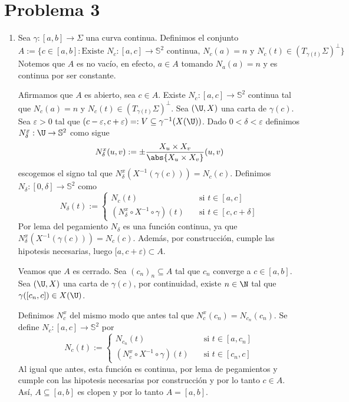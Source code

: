\documentclass{article}
\begin{document}
\section*{Problema 3}
\begin{enumerate}
    \item Sea $\gamma:[a,b]\to\Sigma$ una curva continua. Definimos el conjunto
    \begin{equation*}
        A:=\{c\in[a,b]:\text{Existe }N_{c}:[a,c]\to\mathbb{S}^{2}\text{ continua, }
        N_{c}(a)=n\text{ y }N_{c}(t)\in(T_{\gamma(t)}\Sigma)^{\perp}\}
    \end{equation*}
    Notemos que $A$ es no vacío, en efecto, $a\in A$ tomando $N_{a}(a)=n$ y es continua por ser
    constante. 
    
    \noindent Afirmamos que $A$ es abierto, sea $c\in A$. Existe $N_{c}:[a,c]\to\mathbb{S}^{2}$
    continua tal que $N_{c}(a)=n$ y $N_{c}(t)\in(T_{\gamma(t)}\Sigma)^{\perp}$. Sea $(\U,X)$ una 
    carta de $\gamma(c)$. Sea $\varepsilon>0$ tal que $(c-\varepsilon,c+\varepsilon)
    =:V\subseteq\gamma^{-1}(X(\U))$. Dado $0<\delta<\varepsilon$ definimos $N_{\delta}^{x}:
    \U\to\mathbb{S}^{2}$ como sigue
    \begin{equation*}
        N_{\delta}^{x}(u,v):=\pm\frac{X_{u}\times X_{v}}{\abs{X_{u}\times X_{v}}}(u,v)
    \end{equation*}
    escogemos el signo tal que $N_{\delta}^{x}(X^{-1}(\gamma(c)))=N_{c}(c)$. Definimos 
    $N_{\delta}:[0,\delta]\to\mathbb{S}^{2}$ como
    \begin{equation*}
        N_{\delta}(t):=\begin{cases}
            N_{c}(t) &\quad\text{si }t\in[a,c] \\
            (N_{\delta}^{x}\circ X^{-1}\circ\gamma)(t) &\quad\text{si }t\in[c,c+\delta]
        \end{cases}
    \end{equation*}
    Por lema del pegamiento $N_{\delta}$ es una función continua, ya que 
    $N_{\delta}^{x}(X^{-1}(\gamma(c)))=N_{c}(c)$. Además, por construcción, cumple las hipotesis 
    necesarias, luego $[a,c+\varepsilon)\subset A$.

    \noindent Veamos que $A$ es cerrado. Sea $(c_{n})_{n}\subseteq A$ tal que 
    $c_{n}$ converge a $c\in[a,b]$. Sea $(\U,X)$ una carta de $\gamma(c)$, por 
    continuidad, existe $n\in\N$ tal que $\gamma([c_{n},c])\in X(\U)$. 
    
    Definimos $N_{c}^{x}$ del mismo modo que antes tal que $N_{c}^{x}(c_{n})=N_{c_{n}}(c_{n})$. 
    Se define $N_{c}:[a,c]\to\mathbb{S}^{2}$ por
    \begin{equation*}
        N_{c}(t):=\begin{cases}
            N_{c_{n}}(t) &\quad\text{si }t\in[a,c_{n}] \\
            (N_{c}^{x}\circ X^{-1}\circ\gamma)(t) &\quad\text{si }t\in[c_{n},c]
        \end{cases}
    \end{equation*}
    Al igual que antes, esta función es continua, por lema de pegamientos y cumple con las 
    hipotesis necesarias por construcción y por lo tanto $c\in A$. Así, $A\subseteq[a,b]$ es clopen
    y por lo tanto $A=[a,b]$.


\end{enumerate}
\end{document}
